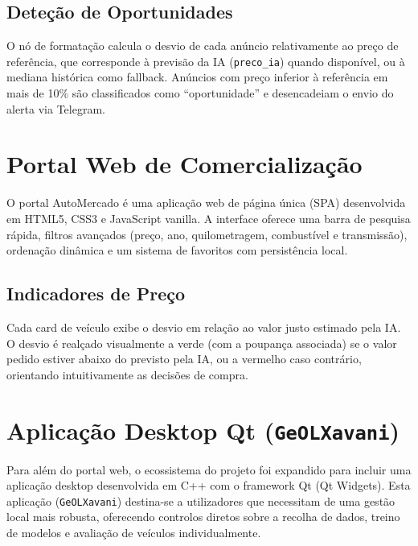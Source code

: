 \documentclass[11pt,a4paper]{article}
\begin{document}
\subsection{Deteção de Oportunidades}
O nó de formatação calcula o desvio de cada anúncio relativamente ao preço de referência, que corresponde à previsão da IA (\texttt{preco\_ia}) quando disponível, ou à mediana histórica como fallback. Anúncios com preço inferior à referência em mais de 10\% são classificados como ``oportunidade'' e desencadeiam o envio do alerta via Telegram.

\section{Portal Web de Comercialização}
O portal AutoMercado é uma aplicação web de página única (SPA) desenvolvida em HTML5, CSS3 e JavaScript vanilla. A interface oferece uma barra de pesquisa rápida, filtros avançados (preço, ano, quilometragem, combustível e transmissão), ordenação dinâmica e um sistema de favoritos com persistência local.

\subsection{Indicadores de Preço}
Cada card de veículo exibe o desvio em relação ao valor justo estimado pela IA. O desvio é realçado visualmente a verde (com a poupança associada) se o valor pedido estiver abaixo do previsto pela IA, ou a vermelho caso contrário, orientando intuitivamente as decisões de compra.

\section{Aplicação Desktop Qt (\texttt{GeOLXavani})}
Para além do portal web, o ecossistema do projeto foi expandido para incluir uma aplicação desktop desenvolvida em C++ com o framework Qt (Qt Widgets). Esta aplicação (\texttt{GeOLXavani}) destina-se a utilizadores que necessitam de uma gestão local mais robusta, oferecendo controlos diretos sobre a recolha de dados, treino de modelos e avaliação de veículos individualmente.
\end{document}
